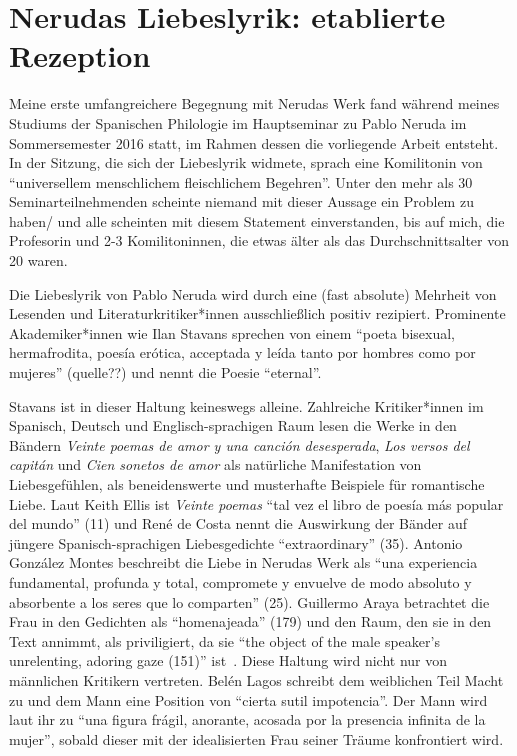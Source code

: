 \section{Nerudas Liebeslyrik: etablierte Rezeption}


Meine erste umfangreichere Begegnung mit Nerudas Werk fand während meines Studiums der Spanischen Philologie im Hauptseminar zu Pablo Neruda im Sommersemester 2016 statt, im Rahmen dessen die vorliegende Arbeit entsteht.
In der Sitzung, die sich der Liebeslyrik widmete, sprach eine Komilitonin von ``universellem menschlichem fleischlichem Begehren''.
Unter den mehr als 30 Seminarteilnehmenden scheinte niemand mit dieser Aussage ein Problem zu haben/ und alle scheinten mit diesem Statement einverstanden, bis auf mich, die Profesorin und 2-3 Komilitoninnen, die etwas älter als das Durchschnittsalter von 20 waren.

Die Liebeslyrik von Pablo Neruda wird durch eine (fast absolute) Mehrheit von Lesenden und Literaturkritiker*innen ausschließlich positiv rezipiert.
Prominente Akademiker*innen wie Ilan Stavans sprechen von einem ``poeta bisexual, hermafrodita, poesía erótica, acceptada y leída tanto por hombres como por mujeres'' (quelle??)
und nennt die Poesie ``eternal''\cite{Stavans2014}.

Stavans ist in dieser Haltung keineswegs alleine.
Zahlreiche Kritiker*innen im Spanisch, Deutsch und Englisch-sprachigen Raum lesen die Werke in den Bändern \textit{Veinte poemas de amor y una canción desesperada}, \textit{Los versos del capitán} und \textit{Cien sonetos de amor} als natürliche Manifestation von Liebesgefühlen, als beneidenswerte und musterhafte Beispiele für romantische Liebe.
Laut Keith Ellis ist \textit{Veinte poemas} ``tal vez el libro de poesía más popular del mundo'' (11)
und René de Costa nennt die Auswirkung der Bänder auf jüngere Spanisch-sprachigen Liebesgedichte ``extraordinary'' (35). %
Antonio González Montes beschreibt die Liebe in Nerudas Werk als ``una experiencia fundamental, profunda y total, compromete y envuelve de modo absoluto y absorbente a los seres que lo comparten'' (25).
Guillermo Araya betrachtet die Frau in den Gedichten als ``homenajeada'' (179) und den Raum, den sie in den Text annimmt, als priviligiert, da sie ``the object of the male speaker's unrelenting, adoring gaze (151)'' ist~\cite{Duncan1992}.
Diese Haltung wird nicht nur von männlichen Kritikern vertreten.
Belén Lagos schreibt dem weiblichen Teil Macht zu und dem Mann eine Position von ``cierta sutil impotencia''.
Der Mann wird laut ihr zu ``una figura frágil, anorante, acosada por la presencia infinita de la mujer'', sobald dieser mit der idealisierten Frau seiner Träume konfrontiert wird.

